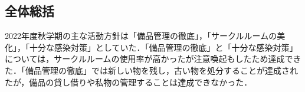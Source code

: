 \subsection*{全体総括}

2022年度秋学期の主な活動方針は「備品管理の徹底」，「サークルルームの美化」，「十分な感染対策」としていた．「備品管理の徹底」と「十分な感染対策」については，サークルルームの使用率が高かったが注意喚起もしたため達成できた．「備品管理の徹底」では新しい物を残し，古い物を処分することが達成されたが，備品の貸し借りや私物の管理することは達成できなかった．
